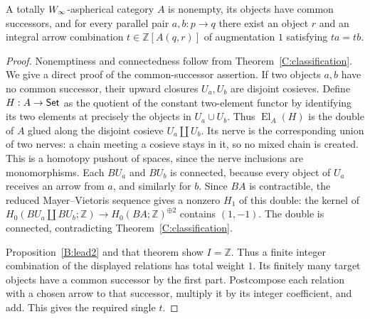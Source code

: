 \begin{lemma}\label{C:directed-affine}
A totally $W_{\infty}$-aspherical category $A$ is nonempty, its objects have common successors, and for every parallel pair $a,b:p\to q$ there exist an object $r$ and an integral arrow combination $t\in\mathbb Z[A(q,r)]$ of augmentation $1$ satisfying $ta=tb$.
\end{lemma}
\begin{proof}
Nonemptiness and connectedness follow from Theorem~\ref{C:classification}. We give a direct proof of the common-successor assertion. If two objects $a,b$ have no common successor, their upward closures $U_a,U_b$ are disjoint cosieves. Define $H:A\to\mathsf{Set}$ as the quotient of the constant two-element functor by identifying its two elements at precisely the objects in $U_a\cup U_b$. Thus $\operatorname{El}_A(H)$ is the double of $A$ glued along the disjoint cosieve $U_a\amalg U_b$. Its nerve is the corresponding union of two nerves: a chain meeting a cosieve stays in it, so no mixed chain is created. This is a homotopy pushout of spaces, since the nerve inclusions are monomorphisms. Each $BU_a$ and $BU_b$ is connected, because every object of $U_a$ receives an arrow from $a$, and similarly for $b$. Since $BA$ is contractible, the reduced Mayer--Vietoris sequence gives a nonzero $H_1$ of this double: the kernel of $H_0(BU_a\amalg BU_b;\mathbb Z)\to H_0(BA;\mathbb Z)^{\oplus2}$ contains $(1,-1)$. The double is connected, contradicting Theorem~\ref{C:classification}.

Proposition~\ref{B:lead2} and that theorem show $I=\mathbb Z$. Thus a finite integer combination of the displayed relations has total weight $1$. Its finitely many target objects have a common successor by the first part. Postcompose each relation with a chosen arrow to that successor, multiply it by its integer coefficient, and add. This gives the required single $t$.
\end{proof}

